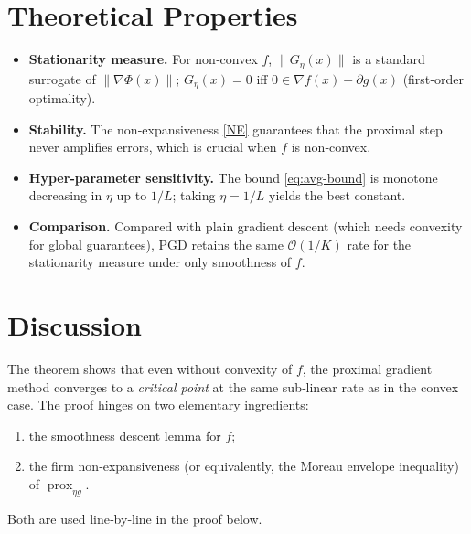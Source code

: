 \documentclass{article}
\newcommand{\prox}{\operatorname{prox}}
\newcommand{\grad}{\nabla}
\begin{document}
\section*{Theoretical Properties}
\begin{itemize}
    \item \textbf{Stationarity measure.} For non‑convex $f$, $\|G_{\eta}(x)\|$ is a standard surrogate of $\|\grad \Phi(x)\|$; $G_{\eta}(x)=0$ iff $0\in\grad f(x)+\partial g(x)$ (first‑order optimality).
    \item \textbf{Stability.} The non‑expansiveness \eqref{NE} guarantees that the proximal step never amplifies errors, which is crucial when $f$ is non‑convex.
    \item \textbf{Hyper‑parameter sensitivity.} The bound \eqref{eq:avg-bound} is monotone decreasing in $\eta$ up to $1/L$; taking $\eta=1/L$ yields the best constant.
    \item \textbf{Comparison.} Compared with plain gradient descent (which needs convexity for global guarantees), PGD retains the same $\mathcal{O}(1/K)$ rate for the stationarity measure under only smoothness of $f$.
\end{itemize}

\section*{Discussion}
The theorem shows that even without convexity of $f$, the proximal gradient method converges to a \emph{critical point} at the same sub‑linear rate as in the convex case. The proof hinges on two elementary ingredients:
\begin{enumerate}[label=\arabic*.]
    \item the smoothness descent lemma for $f$;
    \item the firm non‑expansiveness (or equivalently, the Moreau envelope inequality) of $\prox_{\eta g}$.
\end{enumerate}
Both are used line‑by‑line in the proof below.

\newpage
\end{document}
